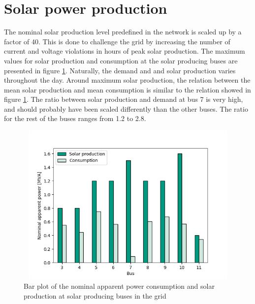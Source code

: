 \documentclass[class=book, crop=false]{standalone}
\begin{document}
\section{Solar power production}
The nominal solar production level predefined in the network is scaled up by a factor of 40. This is done to challenge the grid by increasing the number of current and voltage violations in hours of peak solar production. The maximum values for solar production and consumption at the solar producing buses are presented in figure \ref{fig:discussion:nominal_sgen}. Naturally, the demand and and solar production varies throughout the day. Around maximum solar production, the relation between the mean solar production and mean consumption is similar to the relation showed in figure \ref{fig:discussion:nominal_sgen}. The ratio between solar production and demand at bus 7 is very high, and should probably have been scaled differently than the other buses. The ratio for the rest of the buses ranges from 1.2 to 2.8. 

\begin{figure}[h]
    \center
\includegraphics[height=8cm, width=12cm]{figures/nominal_sgen.png}
    \caption[size = 9]{Bar plot of the nominal apparent power consumption and solar production at solar producing buses in the grid}
    \label{fig:discussion:nominal_sgen}
\end{figure}
\end{document}
